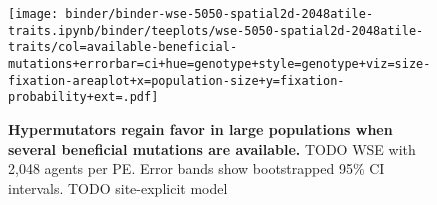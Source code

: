 \begin{figure*}

\begin{minipage}{0.65\textwidth}
  \texttt{[image: binder/binder-wse-5050-spatial2d-2048atile-traits.ipynb/binder/teeplots/wse-5050-spatial2d-2048atile-traits/col=available-beneficial-mutations+errorbar=ci+hue=genotype+style=genotype+viz=size-fixation-areaplot+x=population-size+y=fixation-probability+ext=.pdf]}%
  \end{minipage}
\begin{minipage}{0.3\textwidth}
\caption{
\textbf{Hypermutators regain favor in large populations when several beneficial mutations are available.}
\footnotesize
TODO WSE with 2,048 agents per PE.
Error bands show bootstrapped 95\% CI intervals.
TODO site-explicit model
}
\end{minipage}

\end{figure*}
